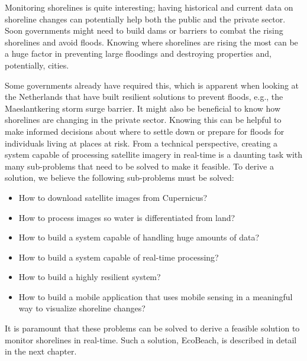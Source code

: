 Monitoring shorelines is quite interesting; having historical and current data on shoreline changes can potentially help both the public and the private sector.  \medbreak 
\noindent
Soon governments might need to build dams or barriers to combat the rising shorelines and avoid floods. Knowing where shorelines are rising the most can be a huge factor in preventing large floodings and destroying properties and, potentially, cities.

Some governments already have required this, which is apparent when looking at the Netherlands that have built resilient solutions to prevent floods, e.g., the Maeslantkering storm surge barrier.   \medbreak 
\noindent
It might also be beneficial to know how shorelines are changing in the private sector. Knowing this can be helpful to make informed decisions about where to settle down or prepare for floods for individuals living at places at risk.  \medbreak 
\noindent
From a technical perspective, creating a system capable of processing satellite imagery in real-time is a daunting task with many sub-problems that need to be solved to make it feasible.
To derive a solution, we believe the following sub-problems must be solved:

\begin{itemize}
    \item How to download satellite images from Cupernicus?
    \item How to process images so water is differentiated from land?
    \item How to build a system capable of handling huge amounts of data? 
    \item How to build a system capable of real-time processing?
    \item How to build a highly resilient system?
    \item How to build a mobile application that uses mobile sensing in a meaningful way to visualize shoreline changes?
\end{itemize}
\noindent
It is paramount that these problems can be solved to derive a feasible solution to monitor shorelines in real-time. Such a solution, EcoBeach, is described in detail in the next chapter.
